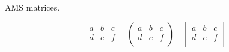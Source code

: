 \documentclass{article}
\begin{document}
	AMS matrices.
	
	\[
	\begin{matrix}
		a & b & c \\
		d & e & f \\
	\end{matrix}
	\quad
	\begin{pmatrix}
		a & b & c \\
		d & e & f \\
	\end{pmatrix}
	\quad
	\begin{bmatrix}
		a & b & c \\
		d & e & f \\
	\end{bmatrix}
	\]
\end{document}
